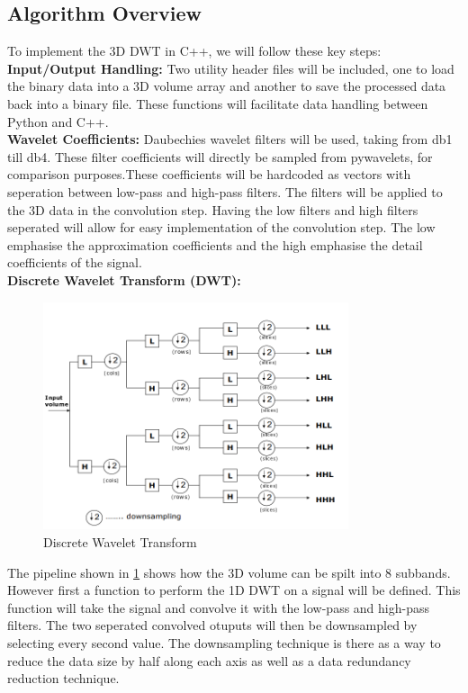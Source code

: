 \documentclass{article}
\begin{document}
\subsection{Algorithm Overview}
To implement the 3D DWT in C++, we will follow these key steps:\\

\textbf{Input/Output Handling:} Two utility header files will be included, one to load the binary data into a 3D volume array and another to save the processed data back into a binary file. These functions will facilitate data handling between Python and C++.\\


\textbf{Wavelet Coefficients:} Daubechies wavelet filters will be used, taking from db1 till db4. These filter coefficients will directly be sampled from pywavelets, for comparison purposes.These coefficients will be hardcoded as vectors with seperation between low-pass and high-pass filters. The filters will be applied to the 3D data in the convolution step. Having the low filters and high filters seperated will allow for easy implementation of the convolution step. The low emphasise the approximation coefficients and the high emphasise the detail coefficients of the signal.\\

\textbf{Discrete Wavelet Transform (DWT):} 
\begin{figure}
    \centering
    \includegraphics[width=0.8\textwidth]{assets/dwt.png}
    \caption{Discrete Wavelet Transform \cite{Prochazka2011}}
    \label{fig2}
\end{figure}

The pipeline shown in \ref{fig2} shows how the 3D volume can be spilt into 8 subbands. However first a function to perform the 1D DWT on a signal will be defined. This function will take the signal and convolve it with the low-pass and high-pass filters. The two seperated convolved otuputs will then be downsampled by selecting every second value. The downsampling technique is there as a way to reduce the data size by half along each axis as well as a data redundancy reduction technique.\\
\end{document}
